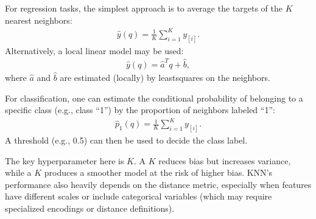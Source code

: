 \documentclass[letterpaper,10pt,english]{jupyterBook}
\begin{document}
\sphinxAtStartPar
For regression tasks, the simplest approach is to average the targets of the \(K\) nearest neighbors:
\begin{equation*}
\begin{split}
\hat{y}(q) = \frac{1}{K}\sum_{i=1}^{K} y_{[i]}.
\end{split}
\end{equation*}
\sphinxAtStartPar
Alternatively, a local linear model may be used:
\begin{equation*}
\begin{split}
\hat{y}(q) = \hat{a}^T q + \hat{b},
\end{split}
\end{equation*}
\sphinxAtStartPar
where \(\hat{a}\) and \(\hat{b}\) are estimated (locally) by least\sphinxhyphen{}squares on the neighbors.

\sphinxAtStartPar
For classification, one can estimate the conditional probability of belonging to a specific class (e.g., class “1”) by the proportion of neighbors labeled “1”:
\begin{equation*}
\begin{split}
\hat{p}_1(q) = \frac{1}{K}\sum_{i=1}^{K} y_{[i]}.
\end{split}
\end{equation*}
\sphinxAtStartPar
A threshold (e.g., 0.5) can then be used to decide the class label.

\sphinxAtStartPar
The key hyperparameter here is \(K\). A  \(K\) reduces bias but increases variance, while a  \(K\) produces a smoother model at the risk of higher bias. KNN’s performance also heavily depends on the distance metric, especially when features have different scales or include categorical variables (which may require specialized encodings or distance definitions).
\end{document}
